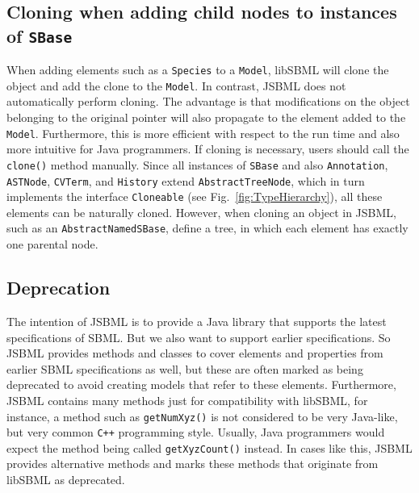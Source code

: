 \subsection{Cloning when adding child nodes to instances of \texttt{SBase}}

When adding elements such as a \texttt{Species}
%
to a \texttt{Model}, libSBML will
clone the object and add the clone to the \texttt{Model}. In contrast,
JSBML does
not automatically perform cloning. The advantage is that modifications on the
object belonging to the original pointer will also propagate to the element
added to the \texttt{Model}. Furthermore, this is more efficient with respect to
the run time and also more intuitive for Java programmers. If cloning is
necessary, users should call the \texttt{clone()} method manually. Since all
instances of \texttt{SBase} and also
\texttt{Annotation},
\texttt{ASTNode},
\texttt{CVTerm}, and
\texttt{History} extend
\texttt{AbstractTreeNode},
which in turn implements the interface \texttt{Cloneable} (see
Fig.~\vref{fig:TypeHierarchy}), all these elements can be naturally cloned.
However, when cloning an object in JSBML, such as an
\texttt{AbstractNamedSBase},
define a tree, in which each element has exactly one parental node.

\subsection{Deprecation}

The intention of JSBML is to provide a Java library
that supports the latest specifications of SBML.
%
%
But we also want to support earlier specifications. So JSBML provides methods
and classes to cover elements and properties from earlier SBML specifications as
well, but these are often marked as being deprecated to avoid creating models
that refer to these elements. Furthermore, JSBML contains many methods just for
compatibility with libSBML, for instance, a method such as \texttt{getNumXyz()}
is not considered to be very Java-like, but very common
\texttt{C++} programming style. Usually, Java
programmers would expect the method being called \texttt{getXyzCount()}
instead. In cases like this, JSBML provides alternative methods and marks these
methods that originate from libSBML as deprecated.


